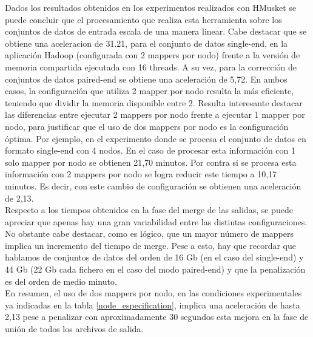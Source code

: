 \documentclass[conference]{IEEEtran}
\begin{document}
Dados los resultados obtenidos en los experimentos realizados con HMusket se puede concluir que el procesamiento que realiza esta herramienta sobre los conjuntos de datos de entrada escala de una manera linear. Cabe destacar que se obtiene una aceleracion de 31.21, para el conjunto de datos single-end, en la aplicación Hadoop (configurada con 2 mappers por nodo) frente a la versión de memoria compartida ejecutada con 16 threads. A su vez, para la corrección de conjuntos de datos paired-end se obtiene una aceleración de 5,72. En ambos casos, la configuración que utiliza 2 mapper por nodo resulta la más eficiente, teniendo que dividir la memoria disponible entre 2. Resulta interesante destacar las diferencias entre ejecutar 2 mappers por nodo frente a ejecutar 1 mapper por nodo, para justificar que el uso de dos mappers por nodo es la configuración óptima. Por ejemplo, en el experimento donde se procesa el conjunto de datos en formato single-end con 4 nodos. En el caso de procesar esta información con 1 solo mapper por nodo se obtienen 21,70 minutos. Por contra si se procesa esta información con 2 mappers por nodo se logra reducir este tiempo a  10,17 minutos. Es decir, con este cambio de configuración se obtienen una aceleración de 2,13.\\

Respecto a los tiempos obtenidos en la fase del merge de las salidas, se puede apreciar que apenas hay una gran variabilidad entre las distintas configuraciones. No obstante cabe destacar, como es lógico, que un mayor número de mappers implica un incremento del tiempo de merge. Pese a esto, hay que recordar que hablamos de conjuntos de datos del orden de 16 Gb (en el caso del single-end) y 44 Gb (22 Gb cada fichero en el caso del modo paired-end) y que la penalización es del orden de medio minuto.\\

En resumen, el uso de dos mappers por nodo, en las condiciones experimentales ya indicadas en la tabla \ref{node_especification}, implica una aceleración de hasta 2,13 pese a penalizar con aproximadamente 30 segundos esta mejora en la fase de unión de todos los archivos de salida.\\
\end{document}
